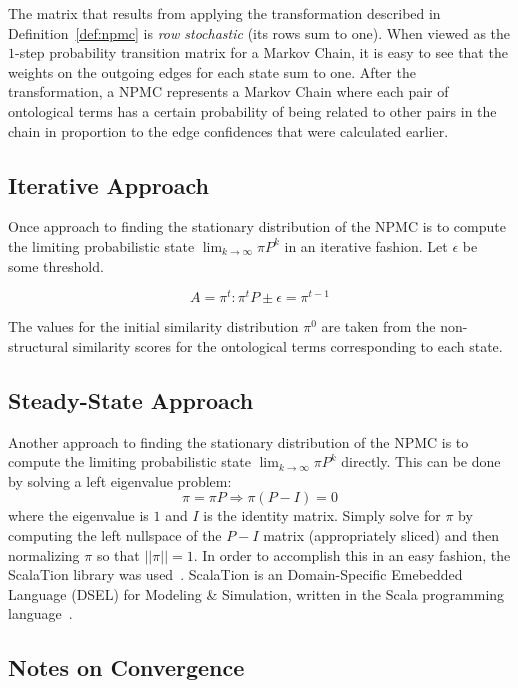 \documentclass[letterpaper,twocolumn,12pt]{article}
\begin{document}
\noindent The matrix that results from applying the transformation described in Definition~\ref{def:npmc} is \textit{row stochastic} (its rows sum to one).
When viewed as the $1$-step probability transition matrix for a Markov Chain, it is easy to see that the weights on the outgoing edges for each state sum to one.
After the transformation, a NPMC represents a Markov Chain where each pair of ontological terms has a certain probability of being related to other pairs in the chain in proportion to the edge confidences that were calculated earlier.

\subsection{Iterative Approach}

Once approach to finding the stationary distribution of the NPMC is to compute the limiting probabilistic state $\lim_{k \to \infty} \pi P^k$ in an iterative fashion. 
Let $\epsilon$ be some threshold.

$$ A = \pi^t : \pi^t P \pm \epsilon = \pi^{t-1} $$

\noindent The values for the initial similarity distribution $\pi^0$ are taken from the non-structural similarity scores for the ontological terms corresponding to each state.

\subsection{Steady-State Approach}

Another approach to finding the stationary distribution of the NPMC is to compute the limiting probabilistic state $\lim_{k \to \infty} \pi P^k$ directly.
This can be done by solving a left eigenvalue problem: 
$$ \pi = \pi P \Rightarrow \pi (P - I) = 0$$
where the eigenvalue is $1$ and $I$ is the identity matrix. 
Simply solve for $\pi$ by computing the left nullspace of the $P - I$ matrix (appropriately sliced) and then normalizing $\pi$ so that $\vert\vert \pi \vert\vert = 1$.
In order to accomplish this in an easy fashion, the ScalaTion library was used~\cite{miller:2010:scalation}. ScalaTion is an Domain-Specific Emebedded Language (DSEL) for Modeling \& Simulation, written in the Scala programming language~\cite{odersky:2011:spec}.

\subsection{Notes on Convergence}
\end{document}
